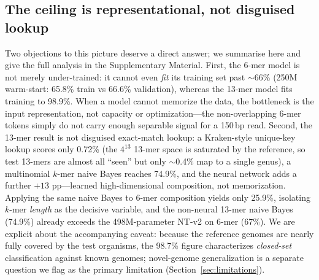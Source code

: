 \subsection{The ceiling is representational, not disguised lookup}
\label{sec:lookup}

Two objections to this picture deserve a direct answer; we summarise here and
give the full analysis in the Supplementary Material. First, the 6-mer model is
not merely under-trained: it cannot even \emph{fit} its training set past
$\sim$66\% (250M warm-start: 65.8\% train vs 66.6\% validation), whereas the
13-mer model fits training to 98.9\%. When a model cannot memorize the data, the
bottleneck is the input representation, not capacity or optimization---the
non-overlapping 6-mer tokens simply do not carry enough separable signal for a
150\,bp read. Second, the 13-mer result is not disguised exact-match lookup: a
Kraken-style unique-key lookup scores only 0.72\% (the $4^{13}$ 13-mer space is
saturated by the reference, so test 13-mers are almost all ``seen'' but only
$\sim$0.4\% map to a single genus), a multinomial $k$-mer naive Bayes reaches
74.9\%, and the neural network adds a further $+13$ pp---learned high-dimensional
composition, not memorization. Applying the same naive Bayes to 6-mer composition
yields only 25.9\%, isolating $k$-mer \emph{length} as the decisive variable, and
the non-neural 13-mer naive Bayes (74.9\%) already exceeds the 498M-parameter
NT-v2 on 6-mer (67\%). We are explicit about the accompanying caveat: because the
reference genomes are nearly fully covered by the test organisms, the 98.7\%
figure characterizes \emph{closed-set} classification against known genomes;
novel-genome generalization is a separate question we flag as the primary
limitation (Section~\ref{sec:limitations}).
